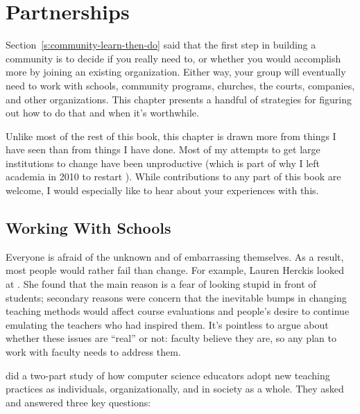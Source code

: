 \chapter{Partnerships}\label{s:partner}

Section~\ref{s:community-learn-then-do} said that
the first step in building a community is to decide if you really need to,
or whether you would accomplish more by joining an existing organization.
Either way,
your group will eventually need to work with
schools, community programs, churches, the courts, companies,
and other organizations.
This chapter presents a handful of strategies for figuring out how to do that
and when it's worthwhile.

Unlike most of the rest of this book,
this chapter is drawn more from things I have seen than from things I have done.
Most of my attempts to get large institutions to change have been unproductive
(which is part of why I left academia in 2010
to restart ).
While contributions to any part of this book are welcome,
I would especially like to hear about your experiences with this.

\section{Working With Schools}\label{s:partner-schools}

Everyone is afraid of the unknown and of embarrassing themselves.
As a result,
most people would rather fail than change.
For example, Lauren Herckis looked at
.
She found that the main reason is a fear of looking stupid in front of students;
secondary reasons were
concern that the inevitable bumps in changing teaching methods would affect course evaluations
and people's desire to continue emulating the teachers who had inspired them.
It's pointless to argue about whether these issues are ``real'' or not:
faculty believe they are,
so any plan to work with faculty needs to address them.

\cite{Bark2015} did a two-part study of how computer science educators adopt new teaching practices
as individuals, organizationally, and in society as a whole.
They asked and answered three key questions:

